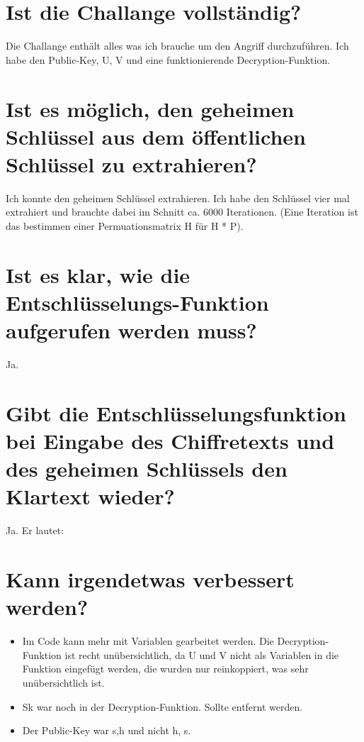 \documentclass[12pt,a4paper]{report}
\theoremstyle{remark}
\begin{document}
\vspace*{2cm}
\chapter*{Ist die Challange vollständig?}

Die Challange enthält alles was ich brauche um den Angriff durchzuführen. Ich habe den Public-Key, U, V und eine 
funktionierende Decryption-Funktion.

\chapter{Ist es möglich, den geheimen Schlüssel aus dem öffentlichen Schlüssel zu extrahieren?}

Ich konnte den geheimen Schlüssel extrahieren. Ich habe den Schlüssel vier mal extrahiert und brauchte dabei im 
Schnitt ca. 6000 Iterationen. (Eine Iteration ist das bestimmen einer Permuationsmatrix H für H * P).

\chapter{Ist es klar, wie die Entschlüsselungs-Funktion aufgerufen werden muss?}

Ja. 

\chapter{Gibt die Entschlüsselungsfunktion bei Eingabe des Chiffretexts und des geheimen Schlüssels den Klartext wieder?}

Ja. Er lautet: 

    
\chapter{Kann irgendetwas verbessert werden?}

\begin{itemize}
    \item Im Code kann mehr mit Variablen gearbeitet werden. Die Decryption-Funktion ist recht unübersichtlich, da 
    U und V nicht als Variablen in die Funktion eingefügt werden, die wurden nur reinkoppiert, was sehr unübersichtlich 
    ist.
    \item Sk war noch in der Decryption-Funktion. Sollte entfernt werden.
    \item Der Public-Key war s,h und nicht h, s.
\end{itemize}
\end{document}
